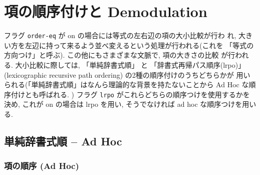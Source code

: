 \section{項の順序付けと Demodulation}
\label{sec:term-ordering}

フラグ \texttt{order-eq} が on の場合には等式の左右辺の項の大小比較が行わ
れ, 大きい方を左辺に持って来るよう並べ変えるという処理が行われる(これを
「等式の方向つけ」と呼ぶ). この他にもさまざまな文脈で, 項の大きさの比較
が行われる. 
大小比較に際しては, 「単純辞書式順」 と 「辞書式再帰パス順序(lrpo)」 
(lexicographic recursive path ordering) の2種の順序付けのうちどちらかが
用いられる(「単純辞書式順」はなんら理論的な背景を持たないことから Ad
Hoc な順序付けとも呼ばれる. ) 
フラグ \texttt{lrpo} がこれらどちらの順序つけを使用するかを決め, これが
on の場合は lrpo を用い, そうでなければ ad hoc な順序つけを用いる. 

\subsection{単純辞書式順 -- Ad Hoc}
\label{sec:ad-hoc-lex}

\subsubsection{項の順序 (Ad Hoc)} \label{sec:lex-order}

